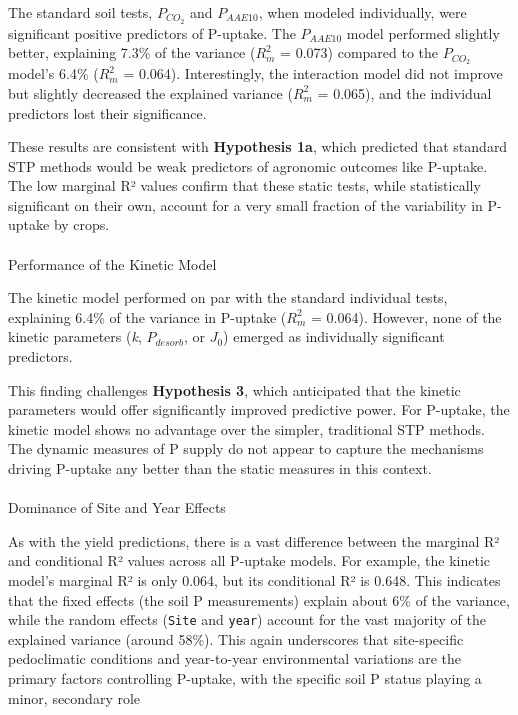 \documentclass[
  a4paper,
]{article}
\makeatletter
\let\oldparagraph\paragraph
\renewcommand{\paragraph}{
    \@ifstar
      \xxxParagraphStar
      \xxxParagraphNoStar
  }
\newcommand{\xxxParagraphStar}[1]{\oldparagraph*{#1}\mbox{}}
\newcommand{\xxxParagraphNoStar}[1]{\oldparagraph{#1}\mbox{}}
\makeatother
\begin{document}
The standard soil tests, \(P_{CO_2}\) and \(P_{AAE10}\), when modeled
individually, were significant positive predictors of P-uptake. The
\(P_{AAE10}\) model performed slightly better, explaining 7.3\% of the
variance (\(R^2_m\) = 0.073) compared to the \(P_{CO_2}\) model's 6.4\%
(\(R^2_m\) = 0.064). Interestingly, the interaction model did not
improve but slightly decreased the explained variance (\(R^2_m\) =
0.065), and the individual predictors lost their significance.

These results are consistent with \textbf{Hypothesis 1a}, which
predicted that standard STP methods would be weak predictors of
agronomic outcomes like P-uptake. The low marginal R² values confirm
that these static tests, while statistically significant on their own,
account for a very small fraction of the variability in P-uptake by
crops.

\paragraph{Performance of the Kinetic
Model}\label{performance-of-the-kinetic-model-1}

The kinetic model performed on par with the standard individual tests,
explaining 6.4\% of the variance in P-uptake (\(R^2_m\) = 0.064).
However, none of the kinetic parameters (\emph{k}, \(P_{desorb}\), or
\(J_0\)) emerged as individually significant predictors.

This finding challenges \textbf{Hypothesis 3}, which anticipated that
the kinetic parameters would offer significantly improved predictive
power. For P-uptake, the kinetic model shows no advantage over the
simpler, traditional STP methods. The dynamic measures of P supply do
not appear to capture the mechanisms driving P-uptake any better than
the static measures in this context.

\paragraph{Dominance of Site and Year
Effects}\label{dominance-of-site-and-year-effects}

As with the yield predictions, there is a vast difference between the
marginal R² and conditional R² values across all P-uptake models. For
example, the kinetic model's marginal R² is only 0.064, but its
conditional R² is 0.648. This indicates that the fixed effects (the soil
P measurements) explain about 6\% of the variance, while the random
effects (\texttt{Site} and \texttt{year}) account for the vast majority
of the explained variance (around 58\%). This again underscores that
site-specific pedoclimatic conditions and year-to-year environmental
variations are the primary factors controlling P-uptake, with the
specific soil P status playing a minor, secondary role
\end{document}
